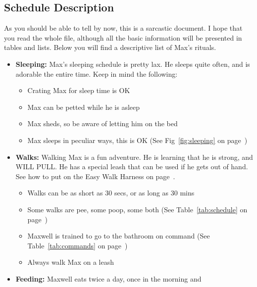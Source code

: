 \documentclass[pdftex,12pt]{article}
\begin{document}
\pagebreak

\subsection{Schedule Description}

As you should be able to tell by now, this is a sarcastic document. I hope that
you read the whole file, although all the basic information will be presented in
tables and lists. Below you will find a descriptive list of Max's rituals.

\bigskip

\begin{itemize}\label{itm:schedule}
    \item \textbf{Sleeping:} Max's sleeping schedule is pretty lax. He sleeps 
        quite often, and is adorable the entire time. Keep in mind the following:
        \begin{itemize}
            \item Crating Max for sleep time is OK
            \item Max can be petted while he is asleep
            \item Max sheds, so be aware of letting him on the bed
            \item Max sleeps in peculiar ways, this is OK
                  (See Fig~\ref{fig:sleeping} on page~\pageref{fig:sleeping})
        \end{itemize}
    \item \textbf{Walks:} Walking Max is a fun adventure. He is learning that he
        is strong, and WILL PULL. He has a special leash that can be used if he 
        gets out of hand. See how to put on the Easy Walk Harness on
        page~\pageref{itm:how_to_harness}.
        \begin{itemize}
            \item Walks can be as short as 30 secs, or as long as 30 mins
            \item Some walks are pee, some poop, some both
                  (See Table~\ref{tab:schedule} on page~\pageref{tab:schedule})
            \item Maxwell is trained to go to the bathroom on command
                  (See Table~\ref{tab:commands} on page~\pageref{tab:commands})
            \item Always walk Max on a leash
        \end{itemize}
    \item \textbf{Feeding:} Maxwell eats twice a day, once in the morning and

\end{itemize}
\end{document}
